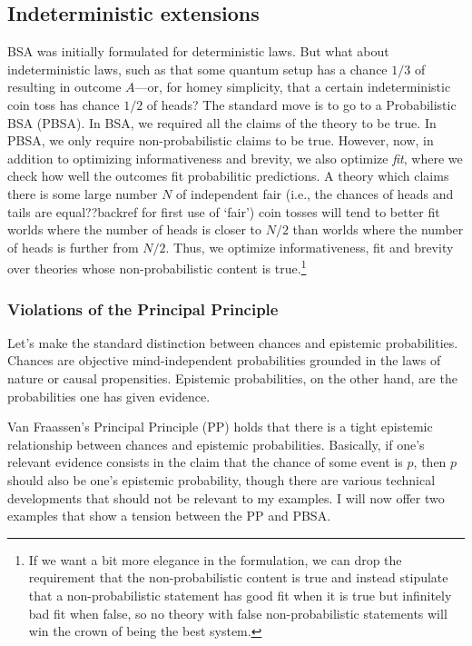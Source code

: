 \subsection{Indeterministic extensions}
BSA was initially formulated for deterministic laws. But what about indeterministic laws, such as that some quantum setup has a
chance $1/3$ of resulting in outcome $A$---or, for homey simplicity, that a certain indeterministic coin toss has chance $1/2$
of heads? The standard move is to go to a Probabilistic BSA (PBSA). In BSA, we required all the claims of the theory to be true.
In PBSA, we only require non-probabilistic claims to be true. However, now, in addition to optimizing informativeness and 
brevity, we also optimize \textit{fit}, where we check how well the outcomes fit probabilitic predictions. A theory which claims 
there is some large number $N$ of independent fair (i.e., the chances of heads and tails are equal??backref for first use of `fair') 
coin tosses will tend to better fit worlds where the number of heads is closer to $N/2$ than worlds where the number of heads is 
further from $N/2$. Thus, we optimize informativeness, fit and brevity over theories whose non-probabilistic content is true.\footnote{If we 
want a bit more elegance in the formulation, we can drop the requirement that the non-probabilistic content is true and instead
stipulate that a non-probabilistic statement has good fit when it is true but infinitely bad fit when false, so no theory with false
non-probabilistic statements will win the crown of being the best system.}

\subsubsection{Violations of the Principal Principle}\label{sec:principal-principle}
Let's make the standard distinction between chances and epistemic probabilities. Chances are objective mind-independent probabilities 
grounded in the laws of nature or causal propensities. Epistemic probabilities, on the other hand, are the probabilities one 
has given evidence. 

Van Fraassen's Principal Principle (PP) holds that there is a tight epistemic relationship between chances and epistemic 
probabilities. Basically, if one's relevant evidence consists in the claim that the chance of some event is $p$, then $p$ should
also be one's epistemic probability, though there are various technical developments that should not be relevant to my examples.
I will now offer two examples that show a tension between the PP and PBSA.

